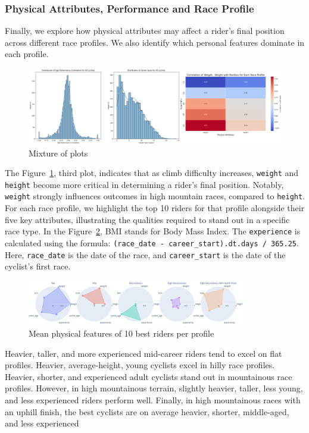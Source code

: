 \documentclass[a4paper, twoside]{article}
\begin{document}
\subsubsection{Physical Attributes, Performance and Race Profile}
Finally, we explore how physical attributes may affect a rider's final position across different race profiles. We also identify which personal features dominate in each profile.
\begin{figure}[ht]
    \centering
    \includegraphics[width=1.0\textwidth]{assets/w_h_p_corr.png}
    \caption{Mixture of plots}
    \label{fig:w-h-p-corr}
\end{figure}
The Figure~\ref{fig:w-h-p-corr}, third plot, indicates that as climb difficulty increases, \texttt{weight} and \texttt{height} become more critical in determining a rider's final position. Notably, \texttt{weight} strongly influences outcomes in high mountain races, compared to \texttt{height}.
\\
For each race profile, we highlight the top 10 riders for that profile alongside their five key attributes, illustrating the qualities required to stand out in a specific race type.
In the Figure~\ref{fig:top_perf_profile}, BMI stands for Body Mass Index. The \texttt{experience} is calculated using the formula: 
\verb+(race_date - career_start).dt.days / 365.25+.
\\
Here, \verb|race_date| is the date of the race, and \verb|career_start| is the date of the cyclist's first race.
\begin{figure}[ht]
    \centering
    \includegraphics[width=0.85\textwidth]{assets/top_perf_profile.png}
    \caption{Mean physical features of 10 best riders per profile}
    \label{fig:top_perf_profile}
\end{figure}
Heavier, taller, and more experienced mid-career riders tend to excel on flat profiles. Heavier, average-height, young cyclists excel in hilly race profiles. Heavier, shorter, and experienced adult cyclists stand out in mountainous race profiles. However, in high mountainous terrain, slightly heavier, taller, less young, and less experienced riders perform well. Finally, in high mountainous races with an uphill finish, the best cyclists are on average heavier, shorter, middle-aged, and less experienced
\end{document}

